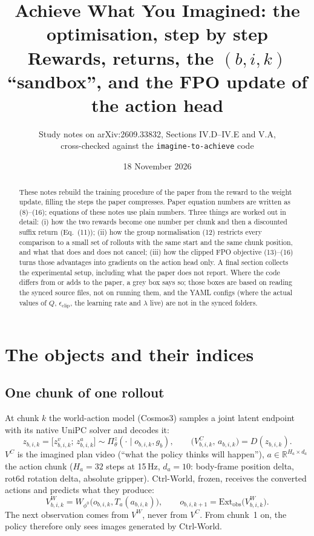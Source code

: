 \documentclass[11pt,a4paper]{article}
\title{\textbf{Achieve What You Imagined: the optimisation, step by step}\\[2pt]
\large Rewards, returns, the $(b,i,k)$ ``sandbox'', and the FPO update of the action head}
\author{\normalsize Study notes on arXiv:2609.33832, Sections IV.D--IV.E and V.A,\\ cross-checked against the \texttt{imagine-to-achieve} code}
\date{18 November 2026}
\newcommand{\VC}{V^{C}}
\newcommand{\VW}{V^{W}}
\newcommand{\R}{\mathbb{R}}
\newcommand{\eqp}[1]{\textup{(#1)}} %
\theoremstyle{remark}
\begin{document}
\maketitle

\begin{abstract}
These notes rebuild the training procedure of the paper from the reward to the weight update, filling the steps the paper compresses. Paper equation numbers are written as \eqp{8}--\eqp{16}; equations of these notes use plain numbers. Three things are worked out in detail: (i) how the two rewards become one number per chunk and then a discounted suffix return (Eq.~\eqp{11}); (ii) how the group normalisation \eqp{12} restricts every comparison to a small set of rollouts with the same start and the same chunk position, and what that does and does not cancel; (iii) how the clipped FPO objective \eqp{13}--\eqp{16} turns those advantages into gradients on the action head only. A final section collects the experimental setup, including what the paper does not report. Where the code differs from or adds to the paper, a grey box says so; those boxes are based on reading the synced source files, not on running them, and the YAML configs (where the actual values of $Q$, $\epsilon_{\mathrm{clip}}$, the learning rate and $\lambda$ live) are not in the synced folders.
\end{abstract}

\tableofcontents
\newpage

\section{The objects and their indices}

\subsection{One chunk of one rollout}
At chunk $k$ the world-action model (Cosmos3) samples a joint latent endpoint with its native UniPC solver and decodes it:
\begin{equation}
z_{b,i,k}=\big[z^{v}_{b,i,k};\,z^{a}_{b,i,k}\big]\sim \Pi^{z}_{\theta}(\cdot\mid o_{b,i,k},g_b),\qquad
\big(\VC_{b,i,k},\,a_{b,i,k}\big)=D(z_{b,i,k}).
\end{equation}
$\VC$ is the imagined plan video (``what the policy thinks will happen''), $a\in\R^{H_a\times d_a}$ the action chunk ($H_a=32$ steps at 15\,Hz, $d_a=10$: body-frame position delta, rot6d rotation delta, absolute gripper). Ctrl-World, frozen, receives the converted actions and predicts what they produce:
\begin{equation}
\VW_{b,i,k}=W_{\phi^0}\big(o_{b,i,k},T_a(a_{b,i,k})\big),\qquad o_{b,i,k+1}=\mathrm{Ext}_{\mathrm{obs}}\big(\VW_{b,i,k}\big).
\end{equation}
The next observation comes from $\VW$, never from $\VC$. From chunk~1 on, the policy therefore only sees images generated by Ctrl-World.
\end{document}
